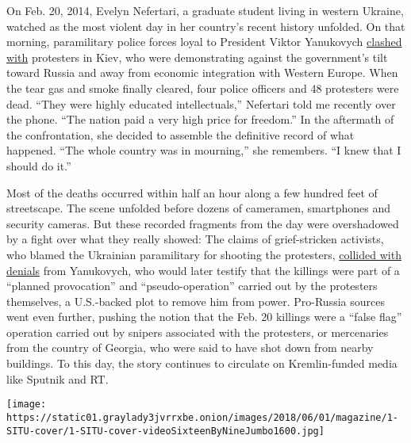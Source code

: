 On Feb. 20, 2014, Evelyn Nefertari, a graduate student living in western
Ukraine, watched as the most violent day in her country's recent history
unfolded. On that morning, paramilitary police forces loyal to President
Viktor Yanukovych
\href{https://www.nytimes3xbfgragh.onion/2014/02/21/world/europe/ukraine.html}{clashed
with} protesters in Kiev, who were demonstrating against the
government's tilt toward Russia and away from economic integration with
Western Europe. When the tear gas and smoke finally cleared, four police
officers and 48 protesters were dead. ``They were highly educated
intellectuals,'' Nefertari told me recently over the phone. ``The nation
paid a very high price for freedom.'' In the aftermath of the
confrontation, she decided to assemble the definitive record of what
happened. ``The whole country was in mourning,'' she remembers. ``I knew
that I should do it.''

Most of the deaths occurred within half an hour along a few hundred feet
of streetscape. The scene unfolded before dozens of cameramen,
smartphones and security cameras. But these recorded fragments from the
day were overshadowed by a fight over what they really showed: The
claims of grief-stricken activists, who blamed the Ukrainian
paramilitary for shooting the protesters,
\href{https://www.nytimes3xbfgragh.onion/video/world/europe/100000002724416/the-ukraine-divide-explained.html}{collided
with denials} from Yanukovych, who would later testify that the killings
were part of a ``planned provocation'' and ``pseudo-operation'' carried
out by the protesters themselves, a U.S.-backed plot to remove him from
power. Pro-Russia sources went even further, pushing the notion that the
Feb. 20 killings were a ``false flag'' operation carried out by snipers
associated with the protesters, or mercenaries from the country of
Georgia, who were said to have shot down from nearby buildings. To this
day, the story continues to circulate on Kremlin-funded media like
Sputnik and RT.

\texttt{[image: https://static01.graylady3jvrrxbe.onion/images/2018/06/01/magazine/1-SITU-cover/1-SITU-cover-videoSixteenByNineJumbo1600.jpg]}

